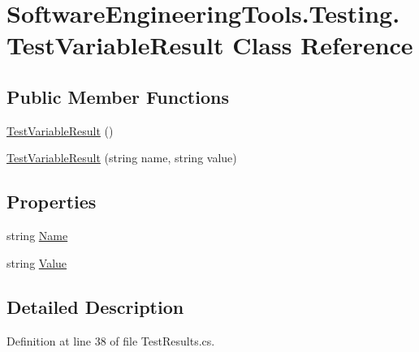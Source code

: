 \hypertarget{class_software_engineering_tools_1_1_testing_1_1_test_variable_result}{\section{Software\+Engineering\+Tools.\+Testing.\+Test\+Variable\+Result Class Reference}
\label{class_software_engineering_tools_1_1_testing_1_1_test_variable_result}
}
\subsection*{Public Member Functions}
\begin{DoxyCompactItemize}
\item 
\hyperlink{class_software_engineering_tools_1_1_testing_1_1_test_variable_result_aed2d667b38c81ec25f2f240a45b62fed}{Test\+Variable\+Result} ()
\item 
\hyperlink{class_software_engineering_tools_1_1_testing_1_1_test_variable_result_a7ae435b55fb37ac1e16ade2e347e3629}{Test\+Variable\+Result} (string name, string value)
\end{DoxyCompactItemize}
\subsection*{Properties}
\begin{DoxyCompactItemize}
\item 
string \hyperlink{class_software_engineering_tools_1_1_testing_1_1_test_variable_result_ac2b2e1e50d960902321f03fc0adb6891}{Name}
\item 
string \hyperlink{class_software_engineering_tools_1_1_testing_1_1_test_variable_result_afcdfe7a68f4156c48a145b53f871d56b}{Value}
\end{DoxyCompactItemize}


\subsection{Detailed Description}


Definition at line 38 of file Test\+Results.\+cs.



